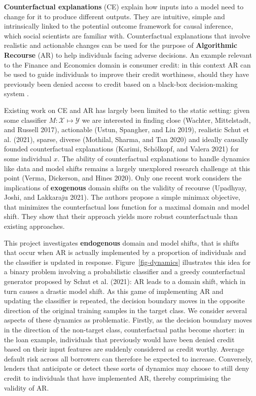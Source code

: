 \documentclass[
  sigconf]{acmart}
\begin{document}
\textbf{Counterfactual explanations} (CE) explain how inputs into a
model need to change for it to produce different outputs. They are
intuitive, simple and intrinsically linked to the potential outcome
framework for causal inference, which social scientists are familiar
with. Counterfactual explanations that involve realistic and actionable
changes can be used for the purpose of \textbf{Algorithmic Recourse}
(AR) to help individuals facing adverse decisions. An example relevant
to the Finance and Economics domain is consumer credit: in this context
AR can be used to guide individuals to improve their credit worthiness,
should they have previously been denied access to credit based on a
black-box decision-making system .

Existing work on CE and AR has largely been limited to the static
setting: given some classifier \(M: \mathcal{X} \mapsto \mathcal{Y}\) we
are interested in finding close (Wachter, Mittelstadt, and Russell
2017), actionable (Ustun, Spangher, and Liu 2019), realistic Schut et
al. (2021), sparse, diverse (Mothilal, Sharma, and Tan 2020) and ideally
causally founded counterfactual explanations (Karimi, Schölkopf, and
Valera 2021) for some individual \(x\). The ability of counterfactual
explanations to handle dynamics like data and model shifts remains a
largely unexplored research challenge at this point (Verma, Dickerson,
and Hines 2020). Only one recent work considers the implications of
\textbf{exogenous} domain shifts on the validity of recourse (Upadhyay,
Joshi, and Lakkaraju 2021). The authors propose a simple minimax
objective, that minimizes the counterfactual loss function for a maximal
domain and model shift. They show that their approach yields more robust
counterfactuals than existing approaches.

This project investigates \textbf{endogenous} domain and model shifts,
that is shifts that occur when AR is actually implemented by a
proportion of individuals and the classifier is updated in response.
Figure~\ref{fig-dynamics} illustrates this idea for a binary problem
involving a probabilistic classifier and a greedy counterfactual
generator proposed by Schut et al. (2021): AR leads to a domain shift,
which in turn causes a drastic model shift. As this game of implementing
AR and updating the classifier is repeated, the decision boundary moves
in the opposite direction of the original training samples in the target
class. We consider several aspects of these dynamics as problematic.
Firstly, as the decision boundary moves in the direction of the
non-target class, counterfactual paths become shorter: in the loan
example, individuals that previously would have been denied credit based
on their input features are suddenly considered as credit worthy.
Average default risk across all borrowers can therefore be expected to
increase. Conversely, lenders that anticipate or detect these sorts of
dynamics may choose to still deny credit to individuals that have
implemented AR, thereby comprimising the validity of AR.
\end{document}
